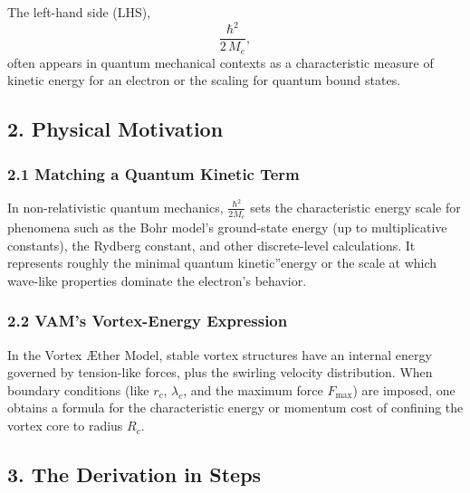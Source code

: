 \documentclass[a4paper,12pt]{article}
\begin{document}
The left-hand side (LHS),
\[
    \frac{\hbar^2}{2\,M_e},
\]
often appears in quantum mechanical contexts as a characteristic measure of kinetic energy for an electron or the scaling for quantum bound states.

\subsection*{2. Physical Motivation}

\subsubsection*{2.1 Matching a Quantum Kinetic Term}
In non-relativistic quantum mechanics, \(\frac{\hbar^2}{2M_e}\) sets the characteristic energy scale for phenomena such as the Bohr model's ground-state energy (up to multiplicative constants), the Rydberg constant, and other discrete-level calculations. It represents roughly the minimal \grqq quantum kinetic\textquotedblright energy or the scale at which wave-like properties dominate the electron's behavior.

\subsubsection*{2.2 VAM's Vortex-Energy Expression}
In the Vortex Æther Model, stable vortex structures have an internal energy governed by tension-like forces, plus the swirling velocity distribution. When boundary conditions (like \(r_c\), \(\lambda_c\), and the maximum force \(F_{\max}\)) are imposed, one obtains a formula for the characteristic energy or momentum cost of confining the vortex core to radius \(R_c\).

\subsection*{3. The Derivation in Steps}
\end{document}

